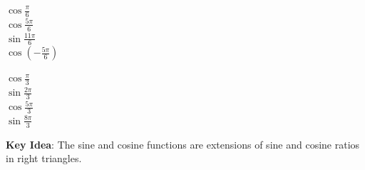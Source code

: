 \documentclass[main]{subfiles}
\begin{document}
\begin{enumerate}[resume]
\begin{tasks}[after-item-skip=64pt, after-skip=64pt]
\task $\cos \frac{\pi}{6}$ \\[4pt] 
\task $\cos \frac{5\pi}{6}$ \\[4pt] 
\task $\sin \frac{11\pi}{6}$ \\[4pt] 
\task $\cos\!\left(-\frac{5\pi}{6}\right)$ \\[4pt] 

\task $\cos\frac{\pi}{3}$ \\[4pt] 
\task $\sin\frac{2\pi}{3}$ \\[4pt] 
\task $\cos\frac{5\pi}{3}$ \\[4pt] 
\task $\sin\frac{8\pi}{3}$ \\[4pt] 
\end{tasks}


\end{enumerate}

\pspace{\newpage}


\textbf{Key Idea}: The sine and cosine functions are extensions of sine and cosine ratios in right triangles.
\end{document}
